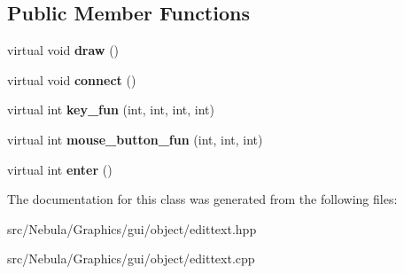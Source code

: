 \subsection*{\-Public \-Member \-Functions}
\begin{DoxyCompactItemize}
\item 
\hypertarget{classNeb_1_1gui_1_1object_1_1edittext_aa6211b16aae04ed3a75e7f3cf57448ac}{virtual void {\bfseries draw} ()}\label{classNeb_1_1gui_1_1object_1_1edittext_aa6211b16aae04ed3a75e7f3cf57448ac}

\item 
\hypertarget{classNeb_1_1gui_1_1object_1_1edittext_abfd525f65e61084f655d0815f4926dbb}{virtual void {\bfseries connect} ()}\label{classNeb_1_1gui_1_1object_1_1edittext_abfd525f65e61084f655d0815f4926dbb}

\item 
\hypertarget{classNeb_1_1gui_1_1object_1_1edittext_aaf964c13d292d5235b0180a78dc7e7cb}{virtual int {\bfseries key\-\_\-fun} (int, int, int, int)}\label{classNeb_1_1gui_1_1object_1_1edittext_aaf964c13d292d5235b0180a78dc7e7cb}

\item 
\hypertarget{classNeb_1_1gui_1_1object_1_1edittext_a9e358f09b75c1c7e554498144cac4f94}{virtual int {\bfseries mouse\-\_\-button\-\_\-fun} (int, int, int)}\label{classNeb_1_1gui_1_1object_1_1edittext_a9e358f09b75c1c7e554498144cac4f94}

\item 
\hypertarget{classNeb_1_1gui_1_1object_1_1edittext_ace2b347d504a9f315d286f958ccc4038}{virtual int {\bfseries enter} ()}\label{classNeb_1_1gui_1_1object_1_1edittext_ace2b347d504a9f315d286f958ccc4038}

\end{DoxyCompactItemize}


\-The documentation for this class was generated from the following files\-:\begin{DoxyCompactItemize}
\item 
src/\-Nebula/\-Graphics/gui/object/edittext.\-hpp\item 
src/\-Nebula/\-Graphics/gui/object/edittext.\-cpp\end{DoxyCompactItemize}
